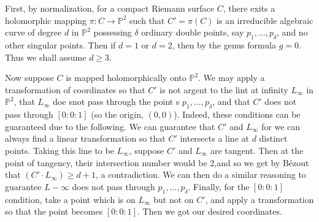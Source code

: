 \documentclass{book}
\renewcommand{\P}{{\mathbb{P}}}
\begin{document}
\begin{Proof}
  First, by normalization, for a compact Riemann surface $C$, there exits a holomorphic mapping $\pi: C \to
  \P^2$ such that $C' = \pi(C)$ is an irreducible algebraic curve of degree $d$ in $\P^2$ possessing $\delta$
  ordinary double points, say $p_1, ..., p_\delta$, and no other singular points.
  Then if $d = 1$ or $d = 2$, then by the genus formula $g= 0$. Thus we
  shall assume $d \ge 3$.

  Now suppose $C$ is mapped holomorphically onto $\P^2$. We may apply a transformation of coordinates so that
  $C'$ is not argent to the lint at infinity $L_\infty$ in $\P^2$,  that $L_\infty$ doe snot pass through  the
  point s $p_1, ..., p_\delta$, and that $C'$ does not pass through $[0:0:1]$ (so the origin, $(0,0)$).
  Indeed, these conditions can be guaranteed due to the following. We can guarantee that $C'$ and $L_\infty$
  for we can always find a linear transformation so that $C'$ intersects a line at $d$ distinct points. Taking
  this line to be $L_\infty$, suppose $C'$ and $L_\infty$ are tangent. Then at the point of tangency, their
  intersection number would be $2$,and so we get by B\'ezout that $(C'\cdot L_\infty) \ge d+1$, a contradiction.
  We can then do a similar reasoning to guarantee $L-\infty$ does not pass through $p_1, ..., p_\delta$.
  Finally, for the $[0:0:1]$ condition, take a point which is on $L_\infty$ but not on $C'$, and apply
  a transformation so that the point becomes $[0:0:1]$. Then we got our desired coordinates.


\end{Proof}
\end{document}
